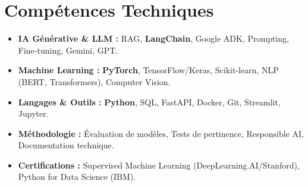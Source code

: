 \documentclass[a4paper,11pt]{article}
\begin{document}
\section{Compétences Techniques}
\begin{itemize}[leftmargin=*, nosep]
    \item \small{\textbf{IA Générative \& LLM :} RAG, \textbf{LangChain}, Google ADK, Prompting, Fine-tuning, Gemini, GPT.}
    \item \small{\textbf{Machine Learning :} \textbf{PyTorch}, TensorFlow/Keras, Scikit-learn, NLP (BERT, Transformers), Computer Vision.}
    \item \small{\textbf{Langages \& Outils :} \textbf{Python}, SQL, FastAPI, Docker, Git, Streamlit, Jupyter.}
    \item \small{\textbf{Méthodologie :} Évaluation de modèles, Tests de pertinence, Responsible AI, Documentation technique.}
    \item \small{\textbf{Certifications :} Supervised Machine Learning (DeepLearning.AI/Stanford), Python for Data Science (IBM).}
\end{itemize}

\end{document}
